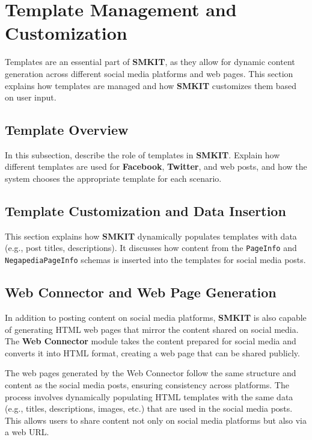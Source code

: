\section{Template Management and Customization}
\label{sec:template_management_and_customization}
Templates are an essential part of \textbf{SMKIT}, as they allow for dynamic content generation across different social media platforms and web pages. This section explains how templates are managed and how \textbf{SMKIT} customizes them based on user input.

\subsection{Template Overview}
\label{subsec:template_overview}
In this subsection, describe the role of templates in \textbf{SMKIT}. Explain how different templates are used for \textbf{Facebook}, \textbf{Twitter}, and web posts, and how the system chooses the appropriate template for each scenario.

\subsection{Template Customization and Data Insertion}
\label{subsec:template_customization_and_data_insertion}
This section explains how \textbf{SMKIT} dynamically populates templates with data (e.g., post titles, descriptions). It discusses how content from the \texttt{PageInfo} and \texttt{NegapediaPageInfo} schemas is inserted into the templates for social media posts.

\subsection{Web Connector and Web Page Generation}
\label{subsec:web_connector_and_web_page_generation}
In addition to posting content on social media platforms, \textbf{SMKIT} is also capable of generating HTML web pages that mirror the content shared on social media. The \textbf{Web Connector} module takes the content prepared for social media and converts it into HTML format, creating a web page that can be shared publicly.

The web pages generated by the Web Connector follow the same structure and content as the social media posts, ensuring consistency across platforms. The process involves dynamically populating HTML templates with the same data (e.g., titles, descriptions, images, etc.) that are used in the social media posts. This allows users to share content not only on social media platforms but also via a web URL.

